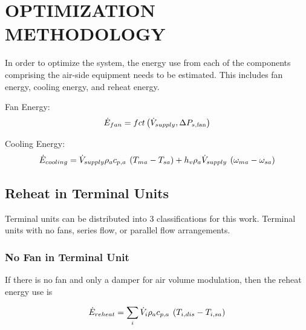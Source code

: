 %
%
%

\chapter{\texorpdfstring{\MakeUppercase{Optimization Methodology}}{Optimization Methodology}}

In order to optimize the system, the energy use from each of the components
comprising the air-side equipment needs to be estimated. This includes fan
energy, cooling energy, and reheat energy.

Fan Energy:
\begin{equation} \label{eq:FanEqnergy}
\dot E_{fan} = fct\left( {\dot{V}_{supply},\Delta {P_{s,{\rm{fan}}}}} \right)
\end{equation}

Cooling Energy:
\begin{equation} \label{eq:CoolingEnergy}
    {\dot E_{cooling}} = {\dot{V}_{supply}}\rho_a c_{p,a}\:\left( {{T_{ma}} - {T_{sa}}} \right) + h_v\rho_a{\dot{V}_{supply}}\:\left( {{\omega _{ma}} - {\omega _{sa}}} \right)
\end{equation}

\section{Reheat in Terminal Units}

Terminal units can be distributed into 3 classifications for this work.
Terminal units with no fans, series flow, or parallel flow arrangements.

\subsection{No Fan in Terminal Unit}

If there is no fan and only a damper for air volume modulation, then the reheat
energy use is

\begin{equation} \label{eq:ReheatEnergy}
    {\dot E_{reheat}} = \sum\limits_i {{\dot{V}_{i}}\rho_a c_{p,a}\:\left( {{T_{i,dis}} - {T_{i,sa}}} \right)}
\end{equation}

